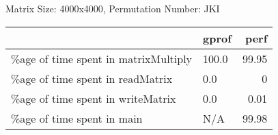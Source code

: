 \documentclass{article}
\begin{document}
    Matrix Size: 4000x4000, Permutation Number: JKI \\
    \begin{tabular}{llr}
\hline
                                      & gprof   &   perf \\
\hline
 \%age of time spent in matrixMultiply & 100.0   &  99.95 \\
 \%age of time spent in readMatrix     & 0.0     &   0    \\
 \%age of time spent in writeMatrix    & 0.0     &   0.01 \\
 \%age of time spent in main           & N/A     &  99.98 \\
\hline
\end{tabular}
    
\end{document}
